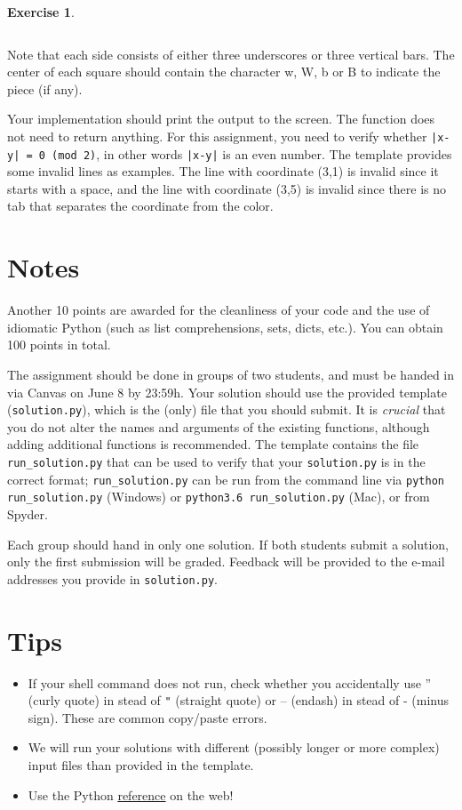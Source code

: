 \documentclass[a4paper]{report}
\theoremstyle{definition}
\newtheorem{exercise}{Exercise}
\newcommand{\doublequote}{\texttt{"}}
\begin{document}
\begin{exercise}
\begin{verbatim}
		\end{verbatim}
		
		\noindent Note that each side consists of either three underscores or three vertical bars. The center of each square should contain the character w, W, b or B to indicate the piece (if any).
		
		Your implementation should print the output to the screen. The function does not need to return anything. For this assignment, you need to verify whether \texttt{|x-y| = 0 (mod 2)}, in other words \texttt{|x-y|} is an even number. The template provides some invalid
		lines as examples. The line with coordinate (3,1) is invalid since it starts with a space, and the line with coordinate (3,5) is invalid	since there is no tab that separates the coordinate from the color.
	\end{exercise}
	
	\section*{Notes}
	Another 10 points are awarded for the cleanliness of your code and the use of idiomatic Python (such as list comprehensions, sets, dicts,
	etc.). You can obtain 100 points in total.
	
	The assignment should be done in groups of two students, and must be handed in
	via Canvas on June 8 by 23:59h.
	Your solution should use the provided template (\texttt{solution.py}), which is the (only) file that you should submit. It is \emph{crucial} that you do not alter the names and arguments of the existing functions, although adding additional functions is recommended. The template contains the file \texttt{run\_solution.py} that can be used to verify that your \texttt{solution.py} is in the correct format; \texttt{run\_solution.py} can be run from the command line via \texttt{python run\_solution.py} (Windows) or \texttt{python3.6 run\_solution.py} (Mac), or from Spyder.
	
	Each group should hand in only one solution. If both students submit a solution, only the first submission will be graded. Feedback will be provided to the e-mail addresses you provide in \texttt{solution.py}.
	
	\section*{Tips}
	
	\begin{itemize}
		\setlength\itemsep{1mm}
		\item If your shell command does not run, check whether you accidentally use '' (curly quote) in stead of \doublequote{} (straight quote) or -- (endash) in stead of - (minus sign). These are common copy/paste errors.
		\item We will run your solutions with different (possibly longer or more complex) input files than provided in the template.
		\item Use the Python \href{https://docs.python.org/3/}{reference} on the web!
	\end{itemize}
	
\end{document}
